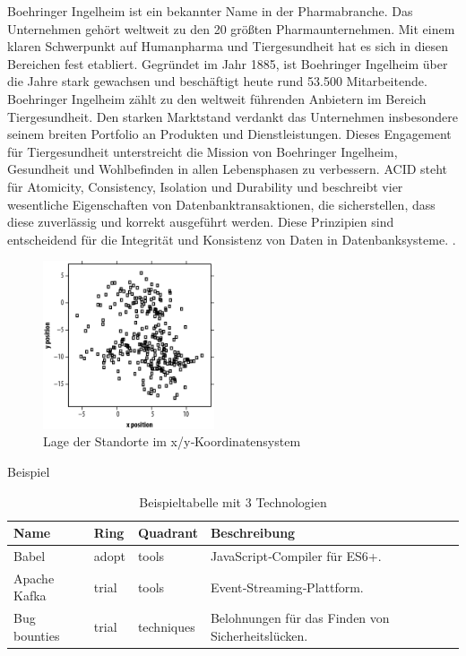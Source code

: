 Boehringer Ingelheim ist ein bekannter Name in der Pharmabranche. Das Unternehmen gehört weltweit zu den 20 größten Pharmaunternehmen. Mit einem klaren Schwerpunkt auf Humanpharma und Tiergesundheit hat es sich in diesen Bereichen fest etabliert.
Gegründet im Jahr 1885, ist Boehringer Ingelheim über die Jahre stark gewachsen und beschäftigt heute rund 53.500 Mitarbeitende.
Boehringer Ingelheim zählt zu den weltweit führenden Anbietern im Bereich Tiergesundheit. Den starken Marktstand verdankt das Unternehmen insbesondere seinem breiten Portfolio an Produkten und Dienstleistungen. Dieses Engagement für Tiergesundheit unterstreicht die Mission von Boehringer Ingelheim, Gesundheit und Wohlbefinden in allen Lebensphasen zu verbessern.
\ac{ACID} steht für Atomicity, Consistency, Isolation und Durability und beschreibt vier wesentliche Eigenschaften von Datenbanktransaktionen, die sicherstellen, dass diese zuverlässig und korrekt ausgeführt werden. Diese Prinzipien sind entscheidend für die Integrität und Konsistenz von Daten in Datenbanksysteme.
\citep{boehringerProfile2024}.
\begin{figure}[H]
    \centering
    \includegraphics[width=0.45\textwidth]{Abbildungen/01_example_image.png}
    \caption{Lage der Standorte im x/y‑Koordinatensystem}
    \label{fig:figure1}
\end{figure}
Beispiel
\begin{table}[H]
    \centering
    \begin{tabular}{|l|l|l|p{5cm}|}
        \hline
        \textbf{Name} & \textbf{Ring} & \textbf{Quadrant} & \textbf{Beschreibung}          \\
        \hline
        Babel         & adopt         & tools             & JavaScript‑Compiler für ES6+. \\
        \hline
        Apache Kafka  & trial         & tools             & Event‑Streaming‑Plattform.     \\
        \hline
        Bug bounties  & trial         & techniques        & Belohnungen für das Finden von Sicherheitslücken.     \\
        \hline
    \end{tabular}
    \caption{Beispieltabelle mit 3 Technologien}
    \label{tab:my_label}
\end{table}